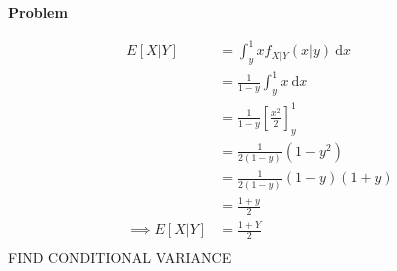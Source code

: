 \documentclass[12pt]{article}
\newenvironment{Ex}{\textbf{Problem}\vspace{.75em}\\}{}
\newcommand{\dd}[1]{\:\mathrm{d}{#1}}
\begin{document}
\begin{enumerate}
\begin{Ex}
\begin{solution}
      \begin{equation}
        \label{eq:1-conditional-expectation}
        \begin{aligned}
          E[X|Y] &= \int_y^1 x f_{X|Y}(x|y) \dd{x} \\
          &= \frac{1}{1-y} \int_y^1 x \dd{x} \\
          &= \frac{1}{1-y} \left[\frac{x^2}{2}\right]_y^1 \\
          &= \frac{1}{2(1-y)} (1-y^2) \\
          &= \frac{1}{2(1-y)} (1-y)(1+y) \\
          &= \frac{1+y}{2} \\
          \implies E[X|Y] &= \frac{1+Y}{2} \\
        \end{aligned}
      \end{equation}
      {\color{red} \huge FIND CONDITIONAL VARIANCE}
    \end{solution}
  \end{Ex}

\end{enumerate}
\end{document}
